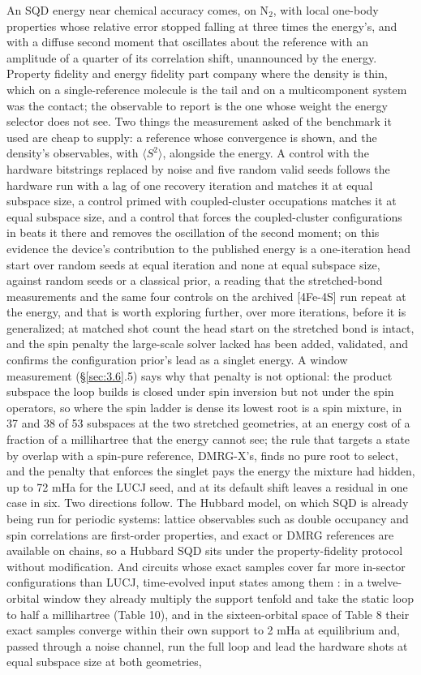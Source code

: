 \documentclass[11pt]{article}
\begin{document}
An SQD energy near chemical accuracy comes, on N$_2$, with local one-body properties whose relative error stopped falling at three times the energy's, and with a diffuse second moment that oscillates about the reference with an amplitude of a quarter of its correlation shift, unannounced by the energy. Property fidelity and energy fidelity part company where the density is thin, which on a single-reference molecule is the tail and on a multicomponent system was the contact; the observable to report is the one whose weight the energy selector does not see. Two things the measurement asked of the benchmark it used are cheap to supply: a reference whose convergence is shown, and the density's observables, with $\langle S^{2}\rangle$, alongside the energy. A control with the hardware bitstrings replaced by noise and five random valid seeds follows the hardware run with a lag of one recovery iteration and matches it at equal subspace size, a control primed with coupled-cluster occupations matches it at equal subspace size, and a control that forces the coupled-cluster configurations in beats it there and removes the oscillation of the second moment; on this evidence the device's contribution to the published energy is a one-iteration head start over random seeds at equal iteration and none at equal subspace size, against random seeds or a classical prior, a reading that the stretched-bond measurements and the same four controls on the archived [4Fe-4S] run repeat at the energy, and that is worth exploring further, over more iterations, before it is generalized; at matched shot count the head start on the stretched bond is intact, and the spin penalty the large-scale solver lacked has been added, validated, and confirms the configuration prior's lead as a singlet energy. A window measurement (\S\ref{sec:3.6}.5) says why that penalty is not optional: the product subspace the loop builds is closed under spin inversion but not under the spin operators, so where the spin ladder is dense its lowest root is a spin mixture, in 37 and 38 of 53 subspaces at the two stretched geometries, at an energy cost of a fraction of a millihartree that the energy cannot see; the rule that targets a state by overlap with a spin-pure reference, DMRG-X's, finds no pure root to select, and the penalty that enforces the singlet pays the energy the mixture had hidden, up to 72 mHa for the LUCJ seed, and at its default shift leaves a residual in one case in six. Two directions follow. The Hubbard model, on which SQD is already being run for periodic systems: lattice observables such as double occupancy and spin correlations are first-order properties, and exact or DMRG references are available on chains, so a Hubbard SQD sits under the property-fidelity protocol without modification. And circuits whose exact samples cover far more in-sector configurations than LUCJ, time-evolved input states among them \cite{MikkelsenNakagawa2025}: in a twelve-orbital window they already multiply the support tenfold and take the static loop to half a millihartree (Table 10), and in the sixteen-orbital space of Table 8 their exact samples converge within their own support to 2 mHa at equilibrium and, passed through a noise channel, run the full loop and lead the hardware shots at equal subspace size at both geometries, 
\end{document}
